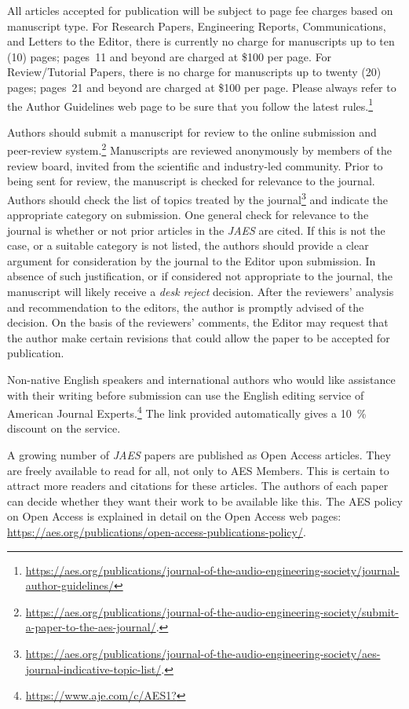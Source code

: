 \documentclass[fleqn,draft]{jaes}
\begin{document}
All articles accepted for publication will be subject to page fee charges based on manuscript type. For Research Papers, Engineering Reports, Communications, and Letters to the Editor, there is currently no charge for manuscripts up to ten (10) pages; pages~11 and beyond are charged at \$100 per page. For Review/Tutorial Papers, there is no charge for manuscripts up to twenty (20) pages; pages~21 and beyond are charged at \$100 per page. Please always refer to the Author Guidelines web page to be sure that you follow the latest rules.\footnote{\url{https://aes.org/publications/journal-of-the-audio-engineering-society/journal-author-guidelines/}}

Authors should submit a manuscript for review to the online submission and peer-review system.\footnote{\url{https://aes.org/publications/journal-of-the-audio-engineering-society/submit-a-paper-to-the-aes-journal/}.} Manuscripts are reviewed anonymously by members of the review board, invited from the scientific and industry-led community. 
Prior to being sent for review, the manuscript is checked for relevance to the journal. Authors should check the list of topics treated by the journal\footnote{\url{https://aes.org/publications/journal-of-the-audio-engineering-society/aes-journal-indicative-topic-list/}.} and indicate the appropriate category on submission. One general check for relevance to the journal is whether or not prior articles in the \emph{JAES} are cited. If this is not the case, or a suitable category is not listed, the authors should provide a clear argument for consideration by the journal to the Editor upon submission. In absence of such justification, or if considered not appropriate to the journal, the manuscript will likely receive a \emph{desk reject} decision. 
After the reviewers’ analysis and recommendation to the editors, the author is promptly advised of the decision. On the basis of the reviewers’ comments, the Editor may request that the author make certain revisions that could allow the paper to be accepted for publication.

Non-native English speakers and international authors who would like assistance with their writing before submission can use the English editing service of American Journal Experts.\footnote{\url{https://www.aje.com/c/AES1?}} The link
provided automatically gives a \SI{10}{\percent} discount on the service.

A growing number of \emph{JAES} papers are published as Open Access articles. They are freely available to read for all, not only to AES Members. This is certain to attract more readers and citations for these articles. The authors of each paper can decide whether they want their work to be available like this. The AES policy on Open Access is explained in detail on the Open Access web pages: \url{https://aes.org/publications/open-access-publications-policy/}.
\end{document}
